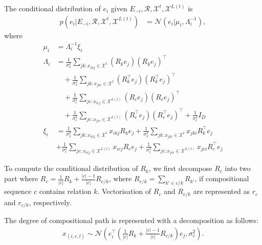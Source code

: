 \documentclass{article}
\begin{document}
The conditional distribution of $e_i$ given $E_{-i}, \mathcal{R}, \mathcal{X}^{t}, \mathcal{X}^{L(t)}$ is 
\begin{align} \label{eqn:sample_e}
p(e_i |E_{-i}, \mathcal{R}, \mathcal{X}^{t}, \mathcal{X}^{L(t)}) &= \mathcal{N}(e_i | \mu_i, \Lambda_i^{-1}),
\end{align}
where
\begin{align*}
\mu_i &= \Lambda_i^{-1}\xi_i \\
\Lambda_i &= \frac{1}{\sigma_x^2} \sum_{jk : x_{ikj} \in \mathcal{X}^{t}} (R_k e_j)(R_k e_j)^\top \\
&\quad+ \frac{1}{\sigma_x^2} \sum_{jk : x_{jki} \in \mathcal{X}^{t}} (R_k^\top e_j)(R_k^\top e_j)^\top \\
&\quad + \frac{1}{\sigma_c^2} \sum_{jc : x_{icj} \in \mathcal{X}^{L(t)}} (R_c e_j)(R_c e_j)^\top \\
&\quad+ \frac{1}{\sigma_c^2} \sum_{jc : x_{jci} \in \mathcal{X}^{L(t)}} (R_c^\top e_j)(R_c^\top e_j)^\top + \frac{1}{\sigma_e^2} {I}_D \\
\xi_i &= \frac{1}{\sigma_x^2}\sum_{jk : x_{ikj} \in \mathcal{X}^{t}}  x_{ikj} R_{k} e_{j} + \frac{1}{\sigma_x^2}\sum_{jk : x_{jki} \in \mathcal{X}^{t}} x_{jki} R_{k}^\top e_{j} \\
& + \frac{1}{\sigma_c^2}\sum_{jc : x_{icj} \in \mathcal{X}^{L(t)}}  x_{icj} R_{c} e_{j} + \frac{1}{\sigma_c^2}\sum_{jc : x_{jci} \in \mathcal{X}^{L(t)}} x_{jci} R_{c}^\top e_{j}
\end{align*}

To compute the conditional distribution of $R_k$, we first decompose $R_c$ into two part where $R_c = \frac{1}{|c|} R_k + \frac{|c|-1}{|c|}R_{c/k}$, where $R_{c/k} = \sum_{k' \in c/k} R_{k'}$, if compositional sequence $c$ contains relation $k$. Vectorisation of $R_c$ and $R_{c/k}$ are represented as $r_c$ and $r_{c/k}$, respectively.

The degree of compositional path is represented with a decomposition as follows:
\begin{align}
x_{(i, c, l)} \sim \mathcal{N}(e_i^\top (\frac{1}{|c|} R_k + \frac{|c|-1}{|c|}R_{c/k}) e_j, \sigma_{c}^2).
\end{align}
\end{document}
